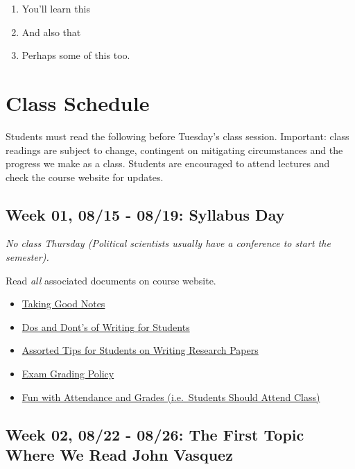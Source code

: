 \documentclass[11pt,]{article}
\providecommand{\tightlist}{%
  \setlength{\itemsep}{0pt}\setlength{\parskip}{0pt}}
\begin{document}
\begin{enumerate}
\def\labelenumi{\arabic{enumi}.}
\item
  You'll learn this
\item
  And also that
\item
  Perhaps some of this too.
\end{enumerate}

\newpage

\hypertarget{class-schedule}{%
\section{Class Schedule}\label{class-schedule}}

Students must read the following before Tuesday's class session. Important: class readings are subject to change, contingent on mitigating circumstances and the progress we make as a class. Students are encouraged to attend lectures and check the course website for updates.

\hypertarget{week-01-0815---0819-syllabus-day}{%
\subsection{Week 01, 08/15 - 08/19: Syllabus Day}\label{week-01-0815---0819-syllabus-day}}

\emph{No class Thursday (Political scientists usually have a conference to start the semester).}

Read \emph{all} associated documents on course website.

\begin{itemize}
\tightlist
\item
  \href{http://svmiller.com/blog/2014/09/taking-good-notes/}{Taking Good Notes}
\item
  \href{http://svmiller.com/blog/2015/06/dos-and-donts-of-writing-for-students/}{Dos and Dont's of Writing for Students}
\item
  \href{http://svmiller.com/blog/2015/12/assorted-tips-students-research-papers/}{Assorted Tips for Students on Writing Research Papers}
\item
  \href{https://www.dropbox.com/s/apihjs7di81aqcv/svm-exam-grading-policy.pdf?dl=0}{Exam Grading Policy}
\item
  \href{http://svmiller.com/blog/2016/05/fun-with-attendance-grades/}{Fun with Attendance and Grades (i.e.~Students Should Attend Class)}
\end{itemize}

\hypertarget{week-02-0822---0826-the-first-topic-where-we-read-john-vasquez}{%
\subsection{Week 02, 08/22 - 08/26: The First Topic Where We Read John Vasquez}\label{week-02-0822---0826-the-first-topic-where-we-read-john-vasquez}}
\end{document}
